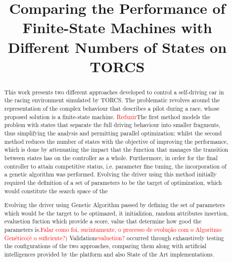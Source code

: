 \documentclass[journal]{IEEEtran}
\newcommand{\toDo}[1]{\textcolor{red}{#1}}
\begin{document}
	\title{Comparing the Performance of\\Finite-State Machines with\\Different Numbers of States on TORCS}
	
	\author{
		}
	
	\maketitle
	
	\begin{abstract}
		
		This work presents two different approaches developed to control a self-driving car in the racing environment
		simulated by TORCS. The problematic revolves around the representation of the complex behaviour that
		describes a pilot during a race, whose proposed solution is a finite-state machine. \toDo{Reduzir}The first method models
		the problem with states that separate the full driving behaviour into smaller fragments, thus simplifying the
		analysis and permitting parallel optimization; whilst the second method reduces the number of states with the
		objective of improving the performance, which is done by attenuating the impact that the function that
		manages the transition between states has on the controller as a whole. Furthermore, in order for the final
		controller to attain competitive status, i.e. parameter fine tuning, the incorporation of a genetic algorithm
		was performed. Evolving the driver using this method initially required the definition of a set of parameters
		to be the target of optimization, which would constitute the search space of the 
		
		
		Evolving the driver using Genetic Algorithm passed by defining the set of parameters 
		which would be the target to be optimazed, it initializion, random attributes insertion, evaluetion fuction 
		which provide a score, value that determine how good the parameters is.\toDo{Falar como foi, sucintamente,
		o processo de evolução com o Algoritmo Genético(é o suficiente?)}
		Validation\toDo{evaluetion?} occurred through exhaustively testing the configurations of the two approaches, comparing them
		along with artificial intelligences provided by the platform and also State of the Art implementations.
				
	\end{abstract}
	
\end{document}
